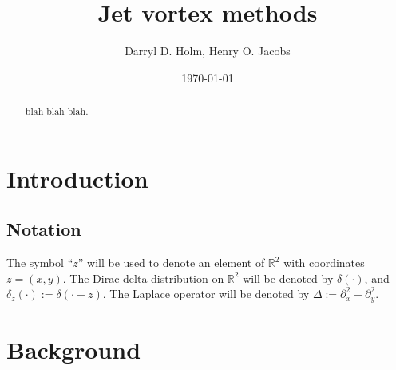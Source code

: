 \documentclass[12pt]{amsart}
\title{Jet vortex methods}
\author{Darryl D. Holm, Henry O. Jacobs}
\date{\today}
\begin{document}
\maketitle

\begin{abstract}
  blah blah blah.
\end{abstract}

\section{Introduction}
\label{sec:intro}


\subsection{Notation}
The symbol ``$z$'' will be used to denote
an element of $\mathbb{R}^2$
with coordinates $z = (x,y)$.
The Dirac-delta distribution on $\mathbb{R}^2$
will be denoted by $\delta(\cdot)$, and $\delta_z(\cdot) := \delta( \cdot - z)$.
The Laplace operator will be denoted by $\Delta := \partial_x^2 + \partial_y^2$.

\section{Background}

\end{document}
